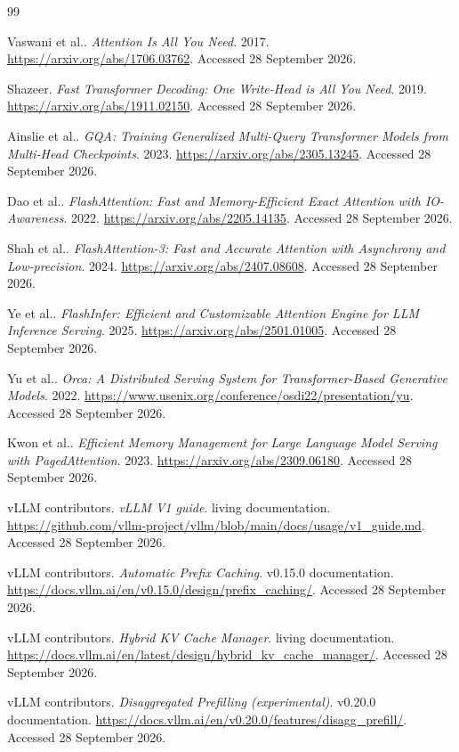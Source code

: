 \begin{thebibliography}{99}

 Vaswani et al.. \emph{Attention Is All You Need}. 2017. \url{https://arxiv.org/abs/1706.03762}. Accessed 28 September 2026.

 Shazeer. \emph{Fast Transformer Decoding: One Write-Head is All You Need}. 2019. \url{https://arxiv.org/abs/1911.02150}. Accessed 28 September 2026.

 Ainslie et al.. \emph{GQA: Training Generalized Multi-Query Transformer Models from Multi-Head Checkpoints}. 2023. \url{https://arxiv.org/abs/2305.13245}. Accessed 28 September 2026.

 Dao et al.. \emph{FlashAttention: Fast and Memory-Efficient Exact Attention with IO-Awareness}. 2022. \url{https://arxiv.org/abs/2205.14135}. Accessed 28 September 2026.

 Shah et al.. \emph{FlashAttention-3: Fast and Accurate Attention with Asynchrony and Low-precision}. 2024. \url{https://arxiv.org/abs/2407.08608}. Accessed 28 September 2026.

 Ye et al.. \emph{FlashInfer: Efficient and Customizable Attention Engine for LLM Inference Serving}. 2025. \url{https://arxiv.org/abs/2501.01005}. Accessed 28 September 2026.

 Yu et al.. \emph{Orca: A Distributed Serving System for Transformer-Based Generative Models}. 2022. \url{https://www.usenix.org/conference/osdi22/presentation/yu}. Accessed 28 September 2026.

 Kwon et al.. \emph{Efficient Memory Management for Large Language Model Serving with PagedAttention}. 2023. \url{https://arxiv.org/abs/2309.06180}. Accessed 28 September 2026.

 vLLM contributors. \emph{vLLM V1 guide}. living documentation. \url{https://github.com/vllm-project/vllm/blob/main/docs/usage/v1_guide.md}. Accessed 28 September 2026.

 vLLM contributors. \emph{Automatic Prefix Caching}. v0.15.0 documentation. \url{https://docs.vllm.ai/en/v0.15.0/design/prefix_caching/}. Accessed 28 September 2026.

 vLLM contributors. \emph{Hybrid KV Cache Manager}. living documentation. \url{https://docs.vllm.ai/en/latest/design/hybrid_kv_cache_manager/}. Accessed 28 September 2026.

 vLLM contributors. \emph{Disaggregated Prefilling (experimental)}. v0.20.0 documentation. \url{https://docs.vllm.ai/en/v0.20.0/features/disagg_prefill/}. Accessed 28 September 2026.


\end{thebibliography}
